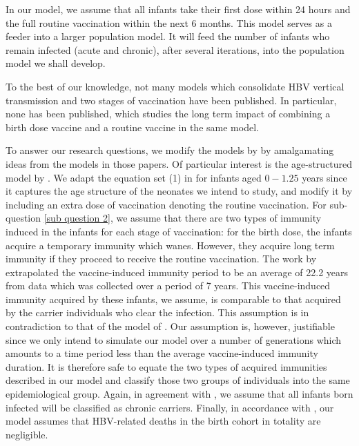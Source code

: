 In our model, we assume that all infants take their first dose within 24 hours and the full routine vaccination within the next 6 months. This model serves as a feeder into a larger population model. It will feed the number of infants who remain infected (acute and chronic),  after several iterations, into the population model we shall develop.

To the best of our knowledge, not many models which consolidate HBV vertical transmission and two stages of vaccination have been published. In particular, none has been published, which studies the long term impact of combining a birth dose vaccine and a routine vaccine in the same model. 

To answer our research questions, we modify the models by \cite{mann2011modelling_NewZealand,zou2010modeling} by amalgamating ideas from the models in those papers. Of particular interest is the age-structured model by \cite{mann2011modelling_NewZealand}. We adapt the equation set (1) in \cite{mann2011modelling_NewZealand} for infants aged $0-1.25$ years since it captures the age structure of the neonates we intend to study, and modify it by including an extra dose of vaccination denoting the routine vaccination. For sub-question \ref{sub question 2}, we assume that there are two types of immunity induced in the infants for each stage of vaccination: for the birth dose, the infants acquire a temporary immunity which wanes. However, they acquire long term immunity if they proceed to receive the routine vaccination. The work by \cite{mclean1994modelling} extrapolated the vaccine-induced immunity period to be an average of 22.2 years from data which was collected over a period of 7 years. This vaccine-induced immunity acquired by these infants, we assume, is comparable to that acquired by the carrier individuals who clear the infection. This assumption is in contradiction to that of the model of \cite{zou2010modeling}. Our assumption is, however, justifiable since we only intend to simulate our model over a number of generations which amounts to a time period less than the average vaccine-induced immunity duration. It is therefore safe to equate the two types of acquired immunities described in our model and classify those two groups of individuals into the same epidemiological group. Again, in agreement with \cite{zhang2012analysisHBVmodel}, we assume that all infants born infected will be classified as chronic carriers. Finally, in accordance with \cite{mann2011modelling_NewZealand}, our model assumes that HBV-related deaths in the birth cohort in totality are negligible.

